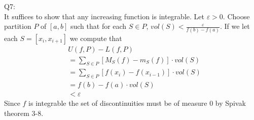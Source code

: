 \documentclass[letterpaper]{article}
\begin{document}
Q7: \\ It suffices to show that any increasing function is integrable. Let $\varepsilon> 0 $. Choose partition $P$ of $[a,b]$ such that for each $S\in P$, $vol(S) < \frac{\varepsilon}{f(b)-f(a)}$. If we let each $S=[x_i,x_{i+1}]$ we compute that 
\begin{align*}
    & U(f,P)-L(f,P)
    \\ & = \sum_{S\in P} [M_S(f)-m_S(f)]\cdot vol(S)
    \\ & = \sum_{S\in P} [f(x_i)-f(x_{i-1})]\cdot vol(S) \tag*{(since f is increasing it attains sup and inf on boundary of S)}
    \\ & = f(b)-f(a) \cdot vol(S) \tag*{(by telescopic summation)}
    \\ & < \varepsilon
\end{align*}
Since $f$ is integrable the set of discontinuities must be of measure 0 by Spivak theorem 3-8. 
\end{document}
